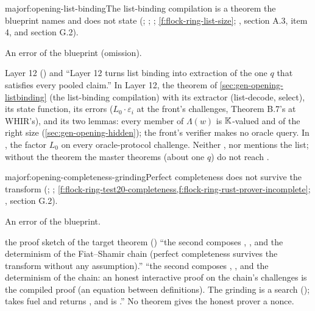 \begin{finding}{major}{f:opening-list-binding}{The list-binding compilation is a theorem the blueprint names and does not state}
  (; ; ;
\cref{f:flock-ring-list-size}; , section A.3, item 4, and section G.2).

 An error of the blueprint (omission).

\begin{change}{Layer 12 () and }
\asis ``Layer 12 turns list binding into extraction of the one $q$ that satisfies every pooled
claim.''
\asproposed In Layer 12, the theorem of \cref{sec:gen-opening-listbinding} (the list-binding
compilation) with its extractor (list-decode, select), its state function, its errors ($L_0·ε_i$ at
the front's challenges, Theorem B.7's at WHIR's), and its two lemmas: every member of $Λ(w)$ is
$\mathbb{K}$-valued and of the right size (\cref{sec:gen-opening-hidden}); the front's verifier makes no
oracle query. In , the factor $L_0$ on every oracle-protocol challenge.
\reason Neither ,  nor  mentions the
list; without the theorem the master theorems (about one $q$) do not reach .
\end{change}
\end{finding}

\begin{finding}{major}{f:opening-completeness-grinding}{Perfect completeness does not survive the transform}
  (;
; \cref{f:flock-ring-test20-completeness,f:flock-ring-rust-prover-incomplete};
, section G.2).

 An error of the blueprint.

\begin{change}{the proof sketch of the target theorem ()}
\asis ``the second composes , ,
 and the determinism of the Fiat--Shamir chain (perfect completeness
survives the transform without any assumption).''
\asproposed ``the second composes , ,
 and the determinism of the chain: an honest interactive proof on
the chain's challenges is the compiled proof (an equation between definitions). The grinding is a
search ();  takes fuel and returns , and
 is .''
\reason No theorem gives the honest prover a nonce.
\end{change}
\end{finding}

